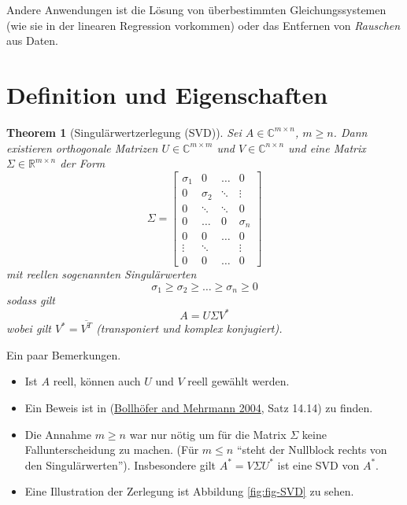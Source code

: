 \documentclass[
]{book}
\providecommand{\tightlist}{%
  \setlength{\itemsep}{0pt}\setlength{\parskip}{0pt}}
\newtheorem{theorem}{Theorem}[chapter]
\theoremstyle{definition}
\theoremstyle{definition}
\theoremstyle{definition}
\theoremstyle{definition}
\theoremstyle{remark}
\begin{document}
Andere Anwendungen ist die Lösung von überbestimmten
Gleichungssystemen (wie sie in der linearen Regression vorkommen) oder das
Entfernen von \emph{Rauschen} aus Daten.

\hypertarget{definition-und-eigenschaften}{%
\section{Definition und Eigenschaften}\label{definition-und-eigenschaften}}

\begin{theorem}[Singulärwertzerlegung (SVD)]
\protect\hypertarget{thm:SVD}{}\label{thm:SVD}Sei \(A\in \mathbb C^{m\times n}\), \(m\geq n\). Dann existieren orthogonale Matrizen \(U \in \mathbb C^{m\times m}\) und \(V\in \mathbb C^{n\times n}\) und eine Matrix \(\Sigma \in \mathbb R^{m\times n}\) der Form
\begin{equation*}
\Sigma = 
\begin{bmatrix}
\sigma_1 & 0 & \dots & 0\\
0 & \sigma_2 &\ddots & \vdots\\
0 & \ddots & \ddots &0\\
  0 & \dots&0 & \sigma_n \\
  0 & 0 & \dots & 0 \\
  \vdots & \ddots &  & \vdots\\
  0 & 0 & \dots & 0
\end{bmatrix}
\end{equation*}
mit reellen sogenannten \emph{Singulärwerten}
\begin{equation*}
\sigma_1 \geq \sigma_2 \geq \dots \geq \sigma_n \geq 0
\end{equation*}
sodass gilt
\begin{equation*}
A = U \Sigma V^*
\end{equation*}
wobei gilt \(V^* = \overline{V^T}\) (transponiert und komplex konjugiert).
\end{theorem}

Ein paar Bemerkungen.

\begin{itemize}
\tightlist
\item
  Ist \(A\) reell, können auch \(U\) und \(V\) reell gewählt werden.
\item
  Ein Beweis ist in (\protect\hyperlink{ref-BolM04}{Bollhöfer and Mehrmann 2004}, Satz 14.14) zu finden.
\item
  Die Annahme \(m \geq n\) war nur nötig um für die Matrix \(\Sigma\) keine Fallunterscheidung zu machen. (Für \(m\leq n\) ``steht der Nullblock rechts von den Singulärwerten''). Insbesondere gilt \(A^* = V\Sigma U^*\) ist eine SVD von \(A^*\).
\item
  Eine Illustration der Zerlegung ist Abbildung \ref{fig:fig-SVD} zu sehen.
\end{itemize}
\end{document}
